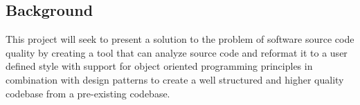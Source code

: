 \subsection{Background}
This project will seek to present a solution to the problem of software source code quality by creating a tool that can analyze source code and reformat it to a user defined style with support for object oriented programming principles in combination with design patterns to create a well structured and higher quality codebase from a pre-existing codebase.
